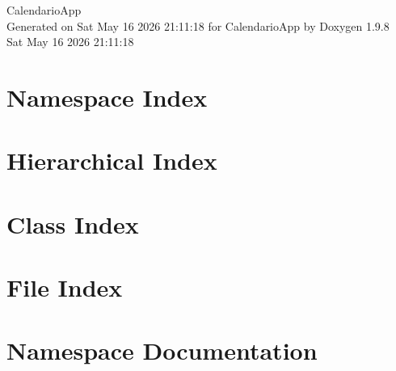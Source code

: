 \documentclass[twoside]{book}
\newcommand{\+}{\discretionary{\mbox{\scriptsize$\hookleftarrow$}}{}{}}
\newcommand{\clearemptydoublepage}{%
    \newpage{\pagestyle{empty}\cleardoublepage}%
  }
\begin{document}
  \raggedbottom
    \hypersetup{pageanchor=false,
                bookmarksnumbered=true,
                pdfencoding=unicode
               }
  \begin{titlepage}
  \vspace*{7cm}
  \begin{center}%
  {\Large Calendario\+App}\\
  \vspace*{1cm}
  {\large Generated on Sat May 16 2026 21\+:11\+:18 for Calendario\+App by Doxygen 1.9.8}\\
    \vspace*{0.5cm}
    {\small Sat May 16 2026 21:11:18}
  \end{center}
  \end{titlepage}
  \clearemptydoublepage
  \tableofcontents
  \clearemptydoublepage
  \hypersetup{pageanchor=true}

\chapter{Namespace Index}

\chapter{Hierarchical Index}

\chapter{Class Index}

\chapter{File Index}

\chapter{Namespace Documentation}







\end{document}
